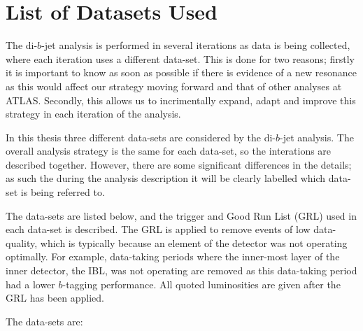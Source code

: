 \section{List of Datasets Used}
\label{sec:evt-datasets}

The di-$b$-jet analysis is performed in several iterations
as data is being collected, where each iteration uses a different data-set.
This is done for two reasons;
firstly it is important to know as soon as possible
if there is evidence of a new resonance as
this would affect our strategy moving forward and that of other analyses at ATLAS.
Secondly, this allows us to incrimentally
expand, adapt and improve this strategy in each iteration of the analysis.

In this thesis three different data-sets are considered by the di-$b$-jet analysis.
The overall analysis strategy is the same for each data-set,
so the interations are described together.
However, there are some significant differences in the details;
as such the during the analysis description it will be clearly labelled
which data-set is being referred to.

The data-sets are listed below,
and the trigger and Good Run List (GRL) used in each data-set is described.
The GRL is applied to remove events of low data-quality,
which is typically because an element of the detector was not operating optimally.
For example, data-taking periods where the inner-most layer of the inner detector,
the IBL, was not operating are removed as
this data-taking period had a lower $b$-tagging performance.
All quoted luminosities are given after the GRL has been applied.

\noindent
The data-sets are:

